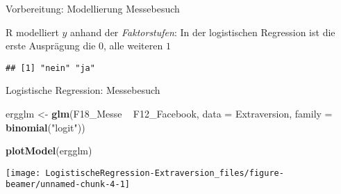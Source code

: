 \documentclass[ignorenonframetext,]{beamer}
\newenvironment{Shaded}{\begin{snugshade}}{\end{snugshade}}
\newcommand{\KeywordTok}[1]{\textcolor[rgb]{0.13,0.29,0.53}{\textbf{{#1}}}}
\newcommand{\DataTypeTok}[1]{\textcolor[rgb]{0.13,0.29,0.53}{{#1}}}
\newcommand{\StringTok}[1]{\textcolor[rgb]{0.31,0.60,0.02}{{#1}}}
\newcommand{\CommentTok}[1]{\textcolor[rgb]{0.56,0.35,0.01}{\textit{{#1}}}}
\newcommand{\NormalTok}[1]{{#1}}
\begin{document}
\begin{frame}[fragile]{Vorbereitung: Modellierung Messebesuch}

R modelliert \(y\) anhand der \emph{Faktorstufen}: In der logistischen
Regression ist die erste Ausprägung die \(0\), alle weiteren \(1\)

\begin{Shaded}
\end{Shaded}

\begin{verbatim}
## [1] "nein" "ja"
\end{verbatim}

\end{frame}

\begin{frame}[fragile]{Logistische Regression: Messebesuch}

\begin{Shaded}
\begin{Highlighting}[]
\NormalTok{ergglm <-}\StringTok{ }\KeywordTok{glm}\NormalTok{(F18_Messe ~}\StringTok{ }\NormalTok{F12_Facebook, }
              \DataTypeTok{data =} \NormalTok{Extraversion,}
              \DataTypeTok{family =} \KeywordTok{binomial}\NormalTok{(}\StringTok{"logit"}\NormalTok{))}
              
\KeywordTok{plotModel}\NormalTok{(ergglm)}
\end{Highlighting}
\end{Shaded}

\begin{center}\texttt{[image: LogistischeRegression-Extraversion\_files/figure-beamer/unnamed-chunk-4-1]} \end{center}

\end{frame}
\end{document}
